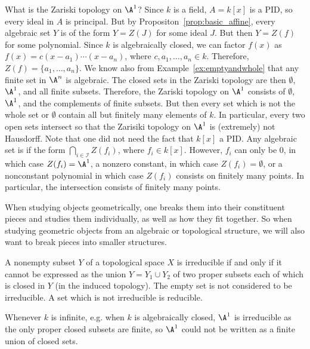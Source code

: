 \begin{ex}
What is the Zariski topology on $\A^1$? Since $k$ is a field, $A= k[x]$ is a PID, so every ideal in $A$ is principal. But by Propositon~\ref{prop:basic_affine}, every algebraic set $Y$ is of the form $Y= Z(J)$ for some ideal $J$. But then $Y=Z(f)$ for some polynomial. Since $k$ is algebraically closed, we can factor $f(x)$ as $f(x)= c(x-a_1)\cdots(x-a_n)$, where $c, a_1,\ldots,a_n \in k$. Therefore, $Z(f)= \{a_1,\ldots,a_n\}$. We know also from Example~\ref{ex:emptyandwhole} that any finite set in $\A^n$ is algebraic. The closed sets in the Zariski topology are then $\emptyset$, $\A^1$, and all finite subsets. Therefore, the Zariski topology on $\A^1$ consists of $\emptyset$, $\A^1$, and the complements of finite subsets. But then every set which is not the whole set or $\emptyset$ contain all but finitely many elements of $k$. In particular, every two open sets intersect so that the Zarisiki topology on $\A^1$ is (extremely) not Hausdorff. Note that one did not need the fact that $k[x]$ a PID. Any algebraic set is if the form $\bigcap_{i \in \mathcal{I}} Z(f_i)$, where $f_i \in k[x]$. However, $f_i$ can only be 0, in which case $Z(f_i)= \A^1$, a nonzero constant, in which case $Z(f_i)= \emptyset$, or a nonconstant polynomial in which case $Z(f_i)$ consists on finitely many points. In particular, the intersection consists of finitely many points. \xqed
\end{ex}


When studying objects geometrically, one breaks them into their constituent pieces and studies them individually, as well as how they fit together. So when studying geometric objects from an algebraic or topological structure, we will also want to break pieces into smaller structures.


\begin{dfn}[Irreducible]
A nonempty subset $Y$ of a topological space $X$ is irreducible if and only if it cannot be expressed as the union $Y= Y_1 \cup Y_2$ of two proper subsets each of which is closed in $Y$ (in the induced topology). The empty set is not considered to be irreducible. A set which is not irreducible is reducible. 
\end{dfn}


\begin{ex}
Whenever $k$ is infinite, e.g. when $k$ is algebraically closed, $\A^1$ is irreducible as the only proper closed subsets are finite, so $\A^1$ could not be written as a finite union of closed sets. 
\end{ex}


